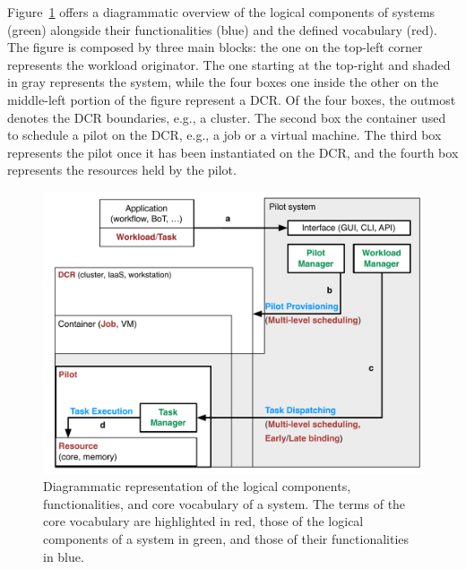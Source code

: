 \documentclass{sig-alternate}
\begin{document}


Figure~\ref{fig:core_vocabulary} offers a diagrammatic overview of the logical
components of \pilot systems (green) alongside their functionalities (blue) and
the defined vocabulary (red). The figure is composed by three main blocks: the
one on the top-left corner represents the workload originator. The one starting
at the top-right and shaded in gray represents the \pilot system, while the four
boxes one inside the other on the middle-left portion of the figure represent a
DCR. Of the four boxes, the outmost denotes the DCR boundaries, e.g., a cluster.
The second box the container used to schedule a pilot on the DCR, e.g., a job or
a virtual machine. The third box represents the pilot once it has been
instantiated on the DCR, and the fourth box represents the resources held by the
pilot.

\begin{figure}[t]
    \centering
        \includegraphics[width=.48\textwidth]{figures/core_vocabulary.pdf}
    \caption{Diagrammatic representation of the logical components,
    functionalities, and core vocabulary of a \pilot system. The terms of the
    core vocabulary are highlighted in red, those of the logical components of a
    \pilot system in green, and those of their functionalities in blue.}
    \label{fig:core_vocabulary}
\end{figure}
\end{document}
